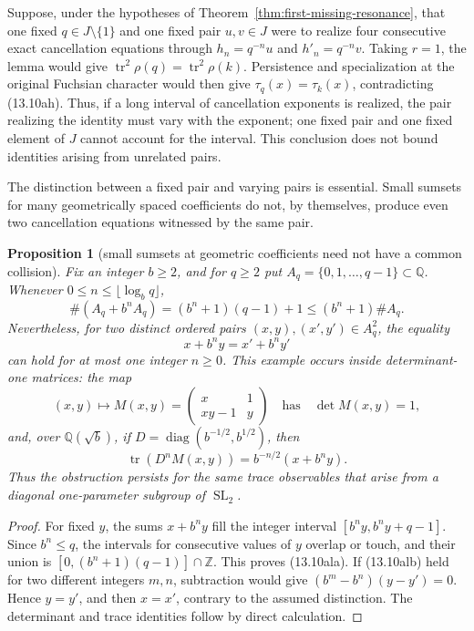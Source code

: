 \documentclass[11pt,reqno]{amsart}
\newtheorem{proposition}[theorem]{Proposition}
\theoremstyle{definition}
\theoremstyle{remark}
\newcommand{\Q}{\mathbb Q}
\newcommand{\Z}{\mathbb Z}
\newcommand{\Tr}{\operatorname{tr}}
\newcommand{\SL}{\operatorname{SL}}
\begin{document}
Suppose, under the hypotheses of
Theorem~\ref{thm:first-missing-resonance}, that one fixed
\(q\in J\setminus\{1\}\) and one fixed pair \(u,v\in J\) were to realize
four consecutive exact cancellation equations through
\(h_n=q^{-n}u\) and \(h'_n=q^{-n}v\).  Taking \(r=1\), the lemma would give
\(\Tr^2\rho(q)=\Tr^2\rho(k)\).  Persistence and specialization at the
original Fuchsian character would then give \(\tau_q(x)=\tau_k(x)\),
contradicting (13.10ah).  Thus, if a long interval of cancellation exponents
is realized, the pair realizing the identity must vary with the exponent;
one fixed pair and one fixed element of \(J\) cannot account for the
interval.  This conclusion does not bound identities arising from
unrelated pairs.

The distinction between a fixed pair and varying pairs is essential.  Small sumsets for
many geometrically spaced coefficients do not, by themselves, produce even
two cancellation equations witnessed by the same pair.

\begin{proposition}[small sumsets at geometric coefficients need not have a common collision]
\label{prop:geometric-sumset-no-common-collision}
Fix an integer \(b\ge2\), and for \(q\ge2\) put
\(A_q=\{0,1,\ldots,q-1\}\subset\Q\).  Whenever
\(0\le n\le\lfloor\log_b q\rfloor\),
\[
 \#(A_q+b^nA_q)=(b^n+1)(q-1)+1\le(b^n+1)\#A_q.
\tag{13.10ala}
\]
Nevertheless, for two distinct ordered pairs
\((x,y),(x',y')\in A_q^2\), the equality
\[
 x+b^ny=x'+b^ny'
\tag{13.10alb}
\]
can hold for at most one integer \(n\ge0\).
This example occurs inside determinant-one matrices: the map
\[
 (x,y)\longmapsto
 M(x,y)=\begin{pmatrix}x&1\\xy-1&y\end{pmatrix}
 \quad\text{has}\quad \det M(x,y)=1,
\]
and, over \(\Q(\sqrt b)\), if
\(D=\operatorname{diag}(b^{-1/2},b^{1/2})\), then
\[
 \Tr(D^nM(x,y))=b^{-n/2}(x+b^ny).
\]
Thus the obstruction persists for the same trace observables that arise from
a diagonal one-parameter subgroup of \(\SL_2\).
\end{proposition}

\begin{proof}
For fixed \(y\), the sums \(x+b^ny\) fill the integer interval
\([b^ny,b^ny+q-1]\).  Since \(b^n\le q\), the intervals for consecutive
values of \(y\) overlap or touch, and their union is
\([0,(b^n+1)(q-1)]\cap\Z\).  This proves (13.10ala).
If (13.10alb) held for two different integers \(m,n\), subtraction would
give \((b^m-b^n)(y-y')=0\).  Hence \(y=y'\), and then \(x=x'\), contrary
to the assumed distinction.  The determinant and trace identities follow
by direct calculation.
\end{proof}
\end{document}
